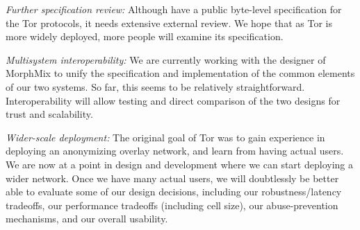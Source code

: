 \documentclass[times,10pt,twocolumn]{article}
\begin{document}
\emph{Further specification review:} Although have a public
byte-level specification for the Tor protocols, it needs
extensive external review.  We hope that as Tor
is more widely deployed, more people will examine its
specification.

\emph{Multisystem interoperability:} We are currently working with the
designer of MorphMix to unify the specification and implementation of
the common elements of our two systems. So far, this seems
to be relatively straightforward.  Interoperability will allow testing
and direct comparison of the two designs for trust and scalability.

\emph{Wider-scale deployment:} The original goal of Tor was to
gain experience in deploying an anonymizing overlay network, and
learn from having actual users.  We are now at a point in design
and development where we can start deploying a wider network.  Once
we have many actual users, we will doubtlessly be better
able to evaluate some of our design decisions, including our
robustness/latency tradeoffs, our performance tradeoffs (including
cell size), our abuse-prevention mechanisms, and
our overall usability.






\end{document}
